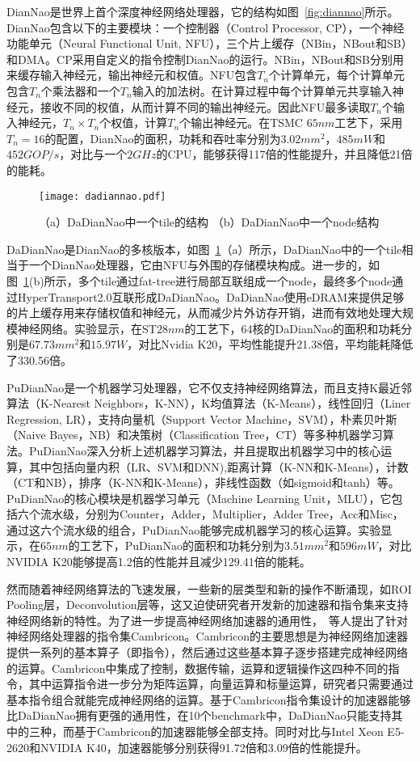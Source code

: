 DianNao是世界上首个深度神经网络处理器，它的结构如图~\ref{fig:diannao}所示。DianNao包含以下的主要模块：一个控制器（Control Processor, CP），一个神经功能单元（Neural Functional Unit, NFU），三个片上缓存（NBin，NBout和SB）和DMA。CP采用自定义的指令控制DianNao的运行。NBin，NBout和SB分别用来缓存输入神经元，输出神经元和权值。NFU包含$T_n$个计算单元，每个计算单元包含$T_n$个乘法器和一个$T_n$输入的加法树。在计算过程中每个计算单元共享输入神经元，接收不同的权值，从而计算不同的输出神经元。因此NFU最多读取$T_n$个输入神经元，$T_n\times T_n$个权值，计算$T_n$个输出神经元。在TSMC $65nm$工艺下，采用$T_n=16$的配置，DianNao的面积，功耗和吞吐率分别为$3.02mm^2$，$485mW$和$452GOP/s$，对比与一个$2GHz$的CPU，能够获得117倍的性能提升，并且降低21倍的能耗。

\begin{figure}[h]
  \centering
  \texttt{[image: dadiannao.pdf]}
  \caption{\footnotesize （a）DaDianNao中一个tile的结构 （b）DaDianNao中一个node结构}
  \label{fig:dadiannao}
\end{figure}

DaDianNao是DianNao的多核版本，如图~\ref{fig:dadiannao}（a）所示，DaDianNao中的一个tile相当于一个DianNao处理器，它由NFU与外围的存储模块构成。进一步的，如图~\ref{fig:dadiannao}(b)所示，多个tile通过fat-tree进行局部互联组成一个node，最终多个node通过HyperTransport2.0互联形成DaDianNao。DaDianNao使用eDRAM来提供足够的片上缓存用来存储权值和神经元，从而减少片外访存开销，进而有效地处理大规模神经网络。实验显示，在ST$28nm$的工艺下，64核的DaDianNao的面积和功耗分别是$67.73mm^2$和$15.97W$，对比Nvidia K20，平均性能提升21.38倍，平均能耗降低了330.56倍。

PuDianNao是一个机器学习处理器，它不仅支持神经网络算法，而且支持K最近邻算法（K-Nearest Neighbors，K-NN），K均值算法（K-Means），线性回归（Liner Regression, LR），支持向量机（Support Vector Machine，SVM），朴素贝叶斯（Naive Bayes，NB）和决策树（Classification Tree，CT）等多种机器学习算法。PuDianNao深入分析上述机器学习算法，并且提取出机器学习中的核心运算，其中包括向量内积（LR、SVM和DNN),距离计算（K-NN和K-Means），计数（CT和NB），排序（K-NN和K-Means），非线性函数（如sigmoid和tanh）等。PuDianNao的核心模块是机器学习单元（Machine Learning Unit，MLU），它包括六个流水级，分别为Counter，Adder，Multiplier，Adder Tree，Acc和Misc，通过这六个流水级的组合，PuDianNao能够完成机器学习的核心运算。实验显示，在$65nm$的工艺下，PuDianNao的面积和功耗分别为$3.51mm^2$和$596mW$，对比NVIDIA K20能够提高1.2倍的性能并且减少129.41倍的能耗。

然而随着神经网络算法的飞速发展，一些新的层类型和新的操作不断涌现，如ROI Pooling层，Deconvolution层等，这又迫使研究者开发新的加速器和指令集来支持神经网络新的特性。为了进一步提高神经网络加速器的通用性，~\citet{liu2016cambricon}等人提出了针对神经网络处理器的指令集Cambricon。Cambricon的主要思想是为神经网络加速器提供一系列的基本算子（即指令），然后通过这些基本算子逐步搭建完成神经网络的运算。Cambricon中集成了控制，数据传输，运算和逻辑操作这四种不同的指令，其中运算指令进一步分为矩阵运算，向量运算和标量运算，研究者只需要通过基本指令组合就能完成神经网络的运算。基于Cambricon指令集设计的加速器能够比DaDianNao拥有更强的通用性，在10个benchmark中，DaDianNao只能支持其中的三种，而基于Cambricon的加速器能够全部支持。同时对比与Intel Xeon E5-2620和NVIDIA K40，加速器能够分别获得91.72倍和3.09倍的性能提升。

